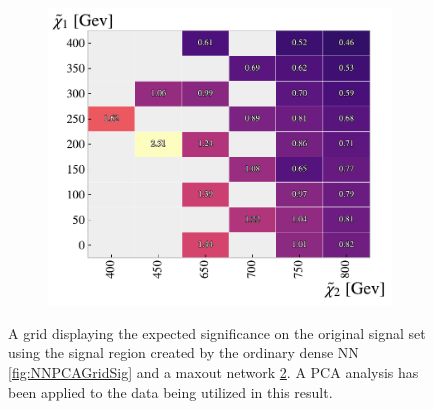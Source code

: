\begin{figure}[H]
{\begin{subfigure}{.5\textwidth}
        \includegraphics[width=\textwidth]{Figures/MLResults/NN/SUSY/Grid/MaxOutPCAGridSig.pdf}
        \caption{}
        \label{fig:MaxOutPCAGridSig}
    \end{subfigure}
    }
    \caption{A grid displaying the expected significance on the original signal set using the signal region 
    created by the ordinary dense \acs{NN} \ref{fig:NNPCAGridSig} and a maxout network \ref{fig:MaxOutPCAGridSig}. A \ac{PCA} 
    analysis has been applied to the data being utilized in this result.}
\end{figure}

